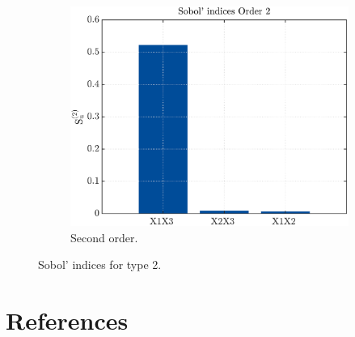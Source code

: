 \documentclass{elsarticle}
\begin{document}
\begin{figure}[hbtp]
\begin{subfigure}[b]{.49\textwidth}
	\centering
	\includegraphics[width=\textwidth]{figures/second_type2.pdf}
	\caption{Second order.\label{fig:second_type2}}
	\end{subfigure}
	\caption{Sobol' indices for type 2.\label{fig:type2}}
\end{figure}

%

%
%
%
%
%
%
%


\FloatBarrier
%
%
%


\section{References}

\end{document}
